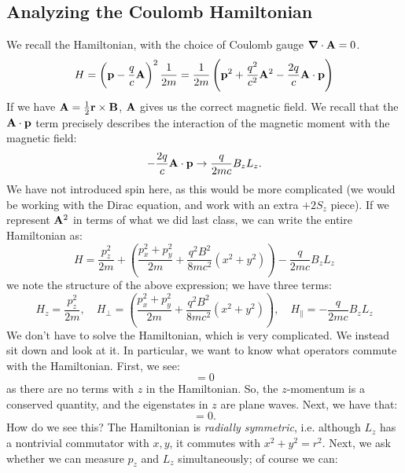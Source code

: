 \subsection{Analyzing the Coulomb Hamiltonian}
We recall the Hamiltonian, with the choice of Coulomb gauge $\nabla \cdot \v{A} = 0$.
\begin{equation}
    H = \left(\mathbf{p} - \frac{q}{c}\mathbf{A}\right)^2\frac{1}{2m} = \frac{1}{2m}\left(\mathbf{p}^2 + \frac{q^2}{c^2}\mathbf{A}^2 - \frac{2q}{c}\mathbf{A}\cdot \mathbf{p}\right)
\end{equation}
If we have $\mathbf{A} = \frac{1}{2}\mathbf{r} \times \mathbf{B}$, $\mathbf{A}$ gives us the correct magnetic field. We recall that the $\mathbf{A} \cdot \mathbf{p}$ term precisely describes the interaction of the magnetic moment with the magnetic field:
\begin{equation}
- \frac{2q}{c}\mathbf{A}\cdot \mathbf{p} \to \frac{q}{2mc} B_zL_z.
\end{equation}
We have not introduced spin here, as this would be more complicated (we would be working with the Dirac equation, and work with an extra $+2S_z$ piece). If we represent $\mathbf{A}^2$ in terms of what we did last class, we can write the entire Hamiltonian as:
\begin{equation}
    H = \frac{p_z^2}{2m} + \left(\frac{p_x^2 + p_y^2}{2m} + \frac{q^2B^2}{8mc^2}\left(x^2 + y^2\right)\right) - \frac{q}{2mc}B_zL_z
\end{equation}
we note the structure of the above expression; we have three terms:
\begin{equation}
    H_z = \frac{p_z^2}{2m}, \quad H_\perp = \left(\frac{p_x^2 + p_y^2}{2m} + \frac{q^2B^2}{8mc^2}\left(x^2 + y^2\right)\right), \quad H_{\parallel} =  - \frac{q}{2mc}B_zL_z
\end{equation}
We don't have to solve the Hamiltonian, which is very complicated. We instead sit down and look at it. In particular, we want to know what operators commute with the Hamiltonian. First, we see:
\begin{equation}
    [H, p_z] = 0
\end{equation}
as there are no terms with $z$ in the Hamiltonian. So, the $z$-momentum is a conserved quantity, and the eigenstates in $z$ are plane waves. Next, we have that:
\begin{equation}
    [H, L_z] = 0.
\end{equation}
How do we see this? The Hamiltonian is \emph{radially symmetric}, i.e. although $L_z$ has a nontrivial commutator with $x, y$, it commutes with $x^2 + y^2 = r^2$. Next, we ask whether we can measure $p_z$ and $L_z$ simultaneously; of course we can:
